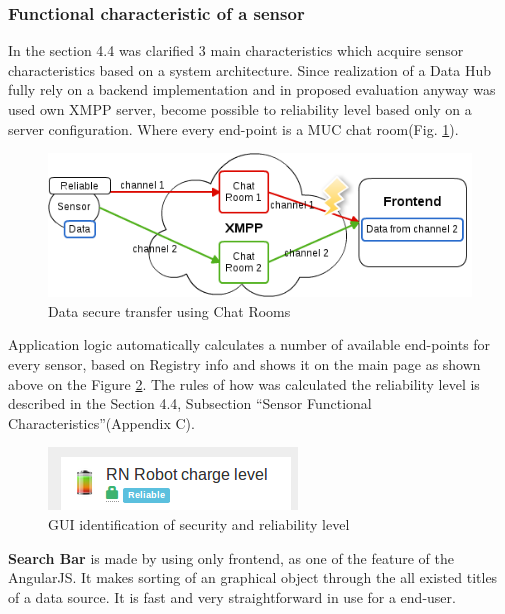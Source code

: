 \subsubsection{Functional characteristic of a sensor}
In the section 4.4 was clarified 3 main characteristics which acquire sensor characteristics based on a system architecture. Since realization of a Data Hub fully rely on a backend implementation and in proposed evaluation anyway was used own XMPP server, become possible to reliability level based only on a server configuration. Where every end-point is a MUC chat room(Fig. \ref{img:reliability}). 
\begin{figure}[!ht]
\centering
\includegraphics[scale=0.6]{images/security.png}   
\caption[Security]{Data secure transfer using Chat Rooms} 
\label{img:reliability}                        
\end{figure}
Application logic automatically calculates a number of available end-points for every sensor, based on Registry info and shows it on the main page as shown above on the Figure \ref{img:icons}. The rules of how was calculated the reliability level is described in the Section 4.4, Subsection ``Sensor Functional Characteristics''(Appendix C).
\newline
\begin{figure}[!ht]
\centering
\includegraphics[scale=1.0]{Screenshots/Icons.png}   
\caption[GUI identification of security and reliability level]{GUI identification of security and reliability level}
\label{img:icons}    
\end{figure}

\textbf{Search Bar} is made by using only frontend, as one of the feature of the AngularJS. It makes sorting of an graphical object through the all existed titles of a data source. It is fast and very straightforward in use for a end-user. 

